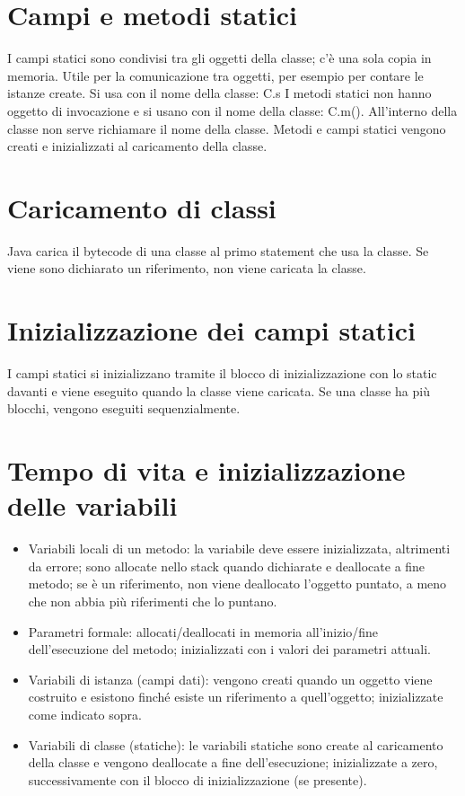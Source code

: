 \section{Campi e metodi statici}
I campi statici sono condivisi tra gli oggetti della classe; c'è una sola copia in memoria. Utile per la comunicazione tra oggetti, per esempio per contare le istanze create.
Si usa con il nome della classe: C.s
I metodi statici non hanno oggetto di invocazione e si usano con il nome della classe: C.m().
All'interno della classe non serve richiamare il nome della classe.
Metodi e campi statici vengono creati e inizializzati al caricamento della classe.

\section{Caricamento di classi}
Java carica il bytecode di una classe al primo statement che usa la classe. Se viene sono dichiarato un riferimento, non viene caricata la classe.

\section{Inizializzazione dei campi statici}
I campi statici si inizializzano tramite il blocco di inizializzazione con lo static davanti e viene eseguito quando la classe viene caricata. Se una classe ha più blocchi, vengono eseguiti sequenzialmente.

\section{Tempo di vita e inizializzazione delle variabili}
\begin{itemize}
\item Variabili locali di un metodo: la variabile deve essere inizializzata, altrimenti da errore; sono allocate nello stack quando dichiarate e deallocate a fine metodo; se è un riferimento, non viene deallocato l'oggetto puntato, a meno che non abbia più riferimenti che lo puntano. 
\item Parametri formale: allocati/deallocati in memoria all'inizio/fine dell'esecuzione del metodo; inizializzati con i valori dei parametri attuali.
\item Variabili di istanza (campi dati): vengono creati quando un oggetto viene costruito e esistono finché esiste un riferimento a quell'oggetto; inizializzate come indicato sopra. 
\item Variabili di classe (statiche): le variabili statiche sono create al caricamento della classe e vengono deallocate a fine dell'esecuzione; inizializzate a zero, successivamente con il blocco di inizializzazione (se presente).
\end{itemize}